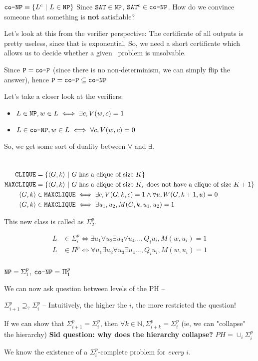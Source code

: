 $\texttt{co-NP} \equiv \{ L^c~\vert~L \in \texttt{NP} \}$
Since $\texttt{SAT} \in \texttt{NP}$, $\texttt{SAT}^c \in \texttt{co-NP}$. How do we convince someone
that something is \textbf{not} satisfiable?

Let's look at this from the verifier perspective: The certificate of all
outputs is pretty useless, since that is exponential. So, we need a
short certificate which allows us to decide whether a given \sat~problem is
unsolvable.

Since $\texttt{P} = \texttt{co-P}$ (since there is no non-determinism, we can simply flip the answer),
hence $\texttt{P} = \texttt{co-P} \subseteq \texttt{co-NP}$


Let's take a closer look at the verifiers:
\begin{itemize}
    \item $L \in \texttt{NP}, w \in L \iff \exists c, V(w, c) = 1$
    \item $L \in \texttt{co-NP}, w \in L \iff \forall c, V(w, c) = 0$
\end{itemize}

So, we get some sort of duality between $\forall$ and $\exists$.

\section{\clique}
\begin{align*}
    \texttt{CLIQUE} &= \{ \langle G, k \rangle~\vert~G~\text{has a clique of size}~K \} \\
    \texttt{MAXCLIQUE} &= \{ \langle G, k \rangle~\vert~G~\text{has a clique of size}~K, \text{ does not have a clique of size } K+1 \}\\
    \langle G, k \rangle &\in \texttt{MAXCLIQUE} \iff \exists c, V(G, k, c) = 1 \land \forall u, W(G, k+1, u) = 0\\
    \langle G, k \rangle &\in \texttt{MAXCLIQUE} \iff \exists u_1, u_2, M(G, k, u_1, u_2) = 1
\end{align*}

This new class is called as $\Sigma_2^p$.


\begin{align*}
    L &\in \Sigma_i^p \iff \exists u_1 \forall u_2 \exists u_3 \forall u_4 \dots, Q_i u_i, M(w, u_i)  = 1 \\
    L &\in \Pi^p \iff \forall u_1 \exists u_2 \forall u_3 \exists u_4 \dots, Q_i u_i, M(w, u_i)  = 1 \\
\end{align*}

$\texttt{NP} = \Sigma^p_1$, $\texttt{co-NP} = \Pi_1^p$

We can now ask question between levels of the PH --

$\Sigma_{i+1}^p \supseteq_? \Sigma_i^p$ -- Intuitively, the higher the $i$, the
more restricted the question!

If we can show that  $\Sigma_{i+1}^p= \Sigma_i^p$, then $\forall k \in \mathbb{N}, \Sigma_{i+k}^p= \Sigma_i^p$
(ie, we can "collapse" the hierarchy)
\textbf{Sid question: why does the hierarchy collapse?}
$PH = \cup_i \Sigma_i^p$


We know the existence of a $\Sigma_i^p$-complete problem for \textit{every $i$}.
